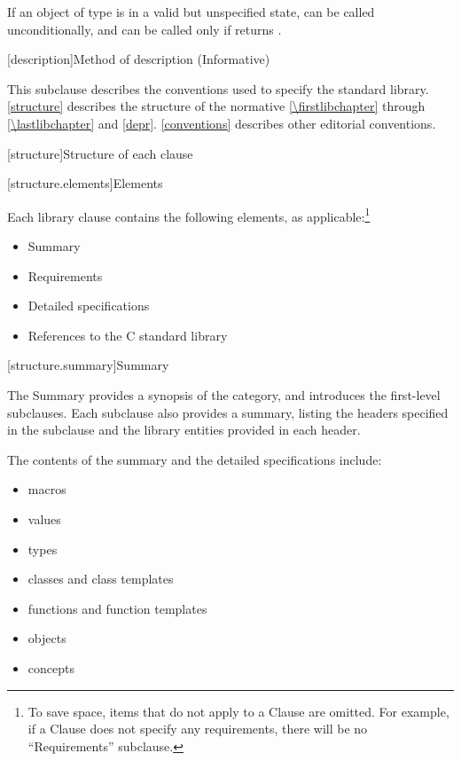 \begin{example}
If an object  of type  is in a
valid but unspecified state,  can be called unconditionally,
and  can be called only if  returns
.
\end{example}

[description]{Method of description (Informative)}

\pnum
This subclause describes the conventions used to specify the \Cpp{} standard
library. \ref{structure} describes the structure of the normative
\ref{\firstlibchapter} through \ref{\lastlibchapter} and
\ref{depr}. \ref{conventions} describes other editorial conventions.

[structure]{Structure of each clause}

[structure.elements]{Elements}

\pnum
Each library clause contains the following elements, as applicable:\footnote{To
save space, items that do not apply to a Clause are omitted.
For example, if a Clause does not specify any requirements,
there will be no ``Requirements'' subclause.}

\begin{itemize}
\item Summary
\item Requirements
\item Detailed specifications
\item References to the C standard library
\end{itemize}

[structure.summary]{Summary}

\pnum
The Summary provides a synopsis of the category, and introduces the first-level subclauses.
Each subclause also provides a summary, listing the headers specified in the
subclause and the library entities provided in each header.

\pnum
The contents of the summary and the detailed specifications include:

\begin{itemize}
\item macros
\item values
\item types
\item classes and class templates
\item functions and function templates
\item objects
\item concepts
\end{itemize}

